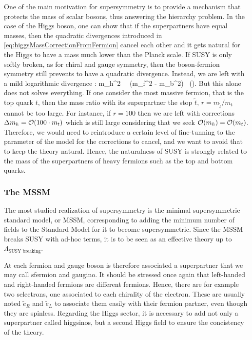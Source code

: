         One of the main motivation for supersymmetry is to provide a mechanism that
        protects the mass of scalar bosons, thus answering the hierarchy problem. In the
        case of the Higgs boson, one can show
        that if the superpartners have equal masses, then the quadratic divergences
        introduced in \ref{eq:higgsMassCorrectionFromFermion} cancel each other and
        it gets natural for the Higgs to have a mass much lower than the Planck scale.
        If SUSY is only softly broken, as for chiral and gauge symmetry, then the
        boson-fermion symmetry still prevents to have a quadratic divergence. Instead,
        we are left with a mild logarithmic divergence :
        {
            \Delta m_h^2 \, \propto \, (m_f^2 - m_b^2) \, \left(\right).
        }
        But this alone does not solves everything. If one consider the most massive
        fermion, that is the top quark $t$, then the mass ratio with its superpartner the
        stop $\tilde{t}$, $r = m_{\tilde{t}} / m_t$ cannot be too large. For instance, if
        $r = 100$ then we are left with corrections $\Delta m_h = \mathcal{O}(100 \cdot m_t)$
        which is still large considering that we seek $\mathcal{O}(m_h) = \mathcal{O}(m_t)$.
        Therefore, we would need to reintroduce a certain level of fine-tunning to the
        parameter of the model for the corrections to cancel, and we want to avoid that
        to keep the theory natural. Hence, the naturalness of SUSY is strongly related to
        the mass of the superpartners of heavy fermions such as the top and bottom quarks.

        \subsubsection{The MSSM}

        The most studied realization of supersymmetry is the minimal supersymmetric standard
        model, or MSSM, corresponding to adding the minimum number of fields to the Standard
        Model for it to become supersymmetric. 
        Since the MSSM breaks SUSY with ad-hoc terms, it is to be seen as an effective
        theory up to $\Lambda_{\text{SUSY breaking}}$.

        At each fermion and gauge boson is therefore associated a superpartner that we may
        call sfermion and gaugino. It should be
        stressed once again that left-handed and right-handed fermions are different
        fermions. Hence, there are for example two selectrons, one associated to
        each chirality of the electron. These are usually noted $\tilde{e}_R$ and $\tilde{e}_L$
        to associate them easily with their fermion partner, even though they are spinless.
        Regarding the Higgs sector, it is necessary to add not only a superpartner called
        higgsinos, but a second Higgs field to ensure the concistency of the theory.

